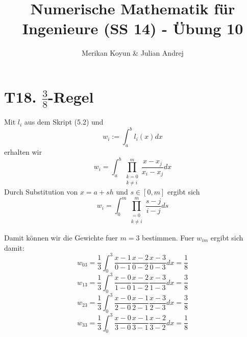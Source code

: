 \documentclass[11pt]{article}
\theoremstyle{plain}
\theoremstyle{definition}
\renewcommand{\o}{\"{o}}
\renewcommand{\u}{\"{u}}
\begin{document}
\title{Numerische Mathematik f\u r Ingenieure (SS 14) - \"{U}bung 10}
\author{Merikan Koyun \& Julian Andrej}
\maketitle

\section*{T18. $\frac{3}{8}$-Regel}
Mit $l_i$ aus dem Skript (5.2) und
\[ w_i := \int_a^b l_i(x) dx \]
erhalten wir
\[ w_i = \int_a^b \prod\limits_{\substack{k=0 \\ k\neq i}}^m \frac{x-x_j}{x_i-x_j} dx \]
Durch Substitution von $x = a + sh$ und $s \in [0,m]$ ergibt sich
\[ w_i = \int_0^m \prod\limits_{\substack{=0 \\ k\neq i}}^m \frac{s-j}{i-j} ds \]

Damit k\o nnen wir die Gewichte fuer $m = 3$ bestimmen. Fuer $w_{im}$ ergibt sich damit:
\[ w_{03} = \frac{1}{3} \int_0^3 \frac{x-1}{0-1} \frac{x-2}{0-2} \frac{x-3}{0-3} dx = \frac{1}{8} \]
\[ w_{13} = \frac{1}{3} \int_0^3 \frac{x-0}{1-0} \frac{x-2}{1-2} \frac{x-3}{1-3} dx = \frac{3}{8} \]
\[ w_{23} = \frac{1}{3} \int_0^3 \frac{x-0}{2-0} \frac{x-1}{2-1} \frac{x-3}{2-3} dx = \frac{3}{8} \]
\[ w_{33} = \frac{1}{3} \int_0^3 \frac{x-0}{3-0} \frac{x-1}{3-1} \frac{x-2}{3-2} dx = \frac{1}{8} \]
\end{document}
